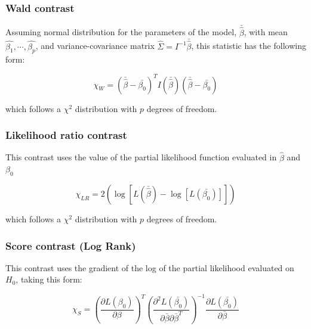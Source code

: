 \documentclass[11pt]{book} %
\begin{document}
      \subsubsection{Wald contrast}

        Assuming normal distribution for the parameters of the model, $\bar{\widehat{\beta}}$, with mean $\widehat{\beta_1},\cdots,\widehat{\beta_p}$, and variance-covariance matrix $\widehat{\Sigma} = I^{-1}\bar{\widehat{\beta}}$, this statistic has the following form:

        \begin{equation}
          \chi_W = (\bar{\widehat{\beta}} - \bar{\beta_0})^TI(\bar{\widehat{\beta}})(\bar{\widehat{\beta}} - \bar{\beta_0})
          \label{eq:cox-wald-contrast}
        \end{equation}

        which follows a $\chi^2$ distribution with $p$ degrees of freedom.

      \subsubsection{Likelihood ratio contrast}

        This contrast uses the value of the partial likelihood function evaluated in $\hat{\beta}$ and $\beta_0$

        \begin{equation}
          \chi_{LR} = 2\left(\log[L(\bar{\widehat{\beta}}) -  \log[L(\bar{\beta_0})]]\right)
          \label{eq:cox-lr-contrast}
        \end{equation}

        which follows a $\chi^2$ distribution with $p$ degrees of freedom.

      \subsubsection{Score contrast (Log Rank)}

        This contrast uses the gradient of the log of the partial likelihood evaluated on $H_0$, taking this form:

        \begin{equation}
          \chi_{S} = \left( \frac{\partial L(\beta_0)}{\partial \beta} \right)^T \left( \frac{\partial^2L(\bar{\beta_0})}{\partial\bar{\beta} \partial\bar{\beta}^T} \right)^{-1} \frac{\partial L(\bar{\beta_0})}{\partial\bar{\beta}}
          \label{eq:cox-score-contrast}
        \end{equation}
\end{document}

